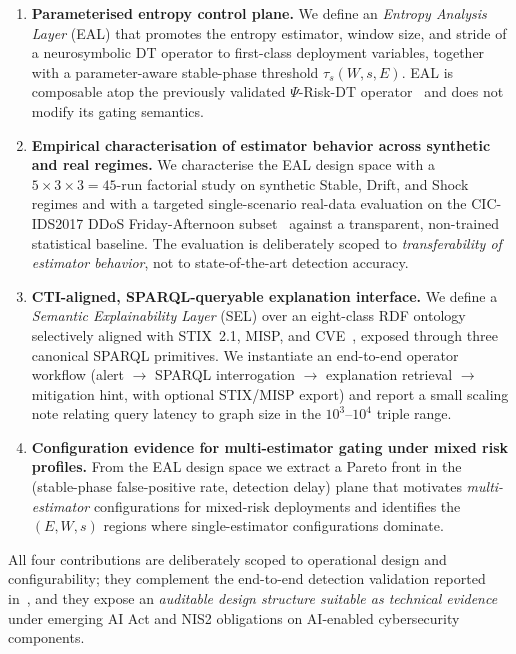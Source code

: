 \documentclass[runningheads]{llncs}
\newcommand{\psiop}{\ensuremath{\Psi}}
\newcommand{\taus}{\ensuremath{\tau_{s}}}
\begin{document}
\begin{enumerate}[label=\textbf{C\arabic*.},leftmargin=*]
  \item \textbf{Parameterised entropy control plane.} We define an
        \emph{Entropy Analysis Layer} (EAL) that promotes the entropy
        estimator, window size, and stride of a neurosymbolic DT
        operator to first-class deployment variables, together with a
        parameter-aware stable-phase threshold $\taus(W, s, E)$. EAL is
        composable atop the previously validated $\psiop$-Risk-DT
        operator~\cite{paper3} and does not modify its gating semantics.
  \item \textbf{Empirical characterisation of estimator behavior across
        synthetic and real regimes.} We characterise the EAL design
        space with a $5 \times 3 \times 3 = 45$-run factorial study on
        synthetic Stable, Drift, and Shock regimes and with a targeted
        single-scenario real-data evaluation on the CIC-IDS2017 DDoS
        Friday-Afternoon subset~\cite{cicids2017} against a transparent,
        non-trained statistical baseline. The evaluation is deliberately
        scoped to \emph{transferability of estimator behavior}, not to
        state-of-the-art detection accuracy.
  \item \textbf{CTI-aligned, SPARQL-queryable explanation interface.}
        We define a \emph{Semantic Explainability Layer} (SEL) over an
        eight-class RDF ontology selectively aligned with STIX~2.1,
        MISP, and CVE~\cite{stix21,misp}, exposed through three
        canonical SPARQL primitives. We instantiate an end-to-end
        operator workflow (alert $\to$ SPARQL interrogation $\to$
        explanation retrieval $\to$ mitigation hint, with optional
        STIX/MISP export) and report a small scaling note relating query
        latency to graph size in the $10^{3}$--$10^{4}$ triple range.
  \item \textbf{Configuration evidence for multi-estimator gating under
        mixed risk profiles.} From the EAL design space we extract a
        Pareto front in the (stable-phase false-positive rate, detection
        delay) plane that motivates \emph{multi-estimator} configurations
        for mixed-risk deployments and identifies the $(E, W, s)$
        regions where single-estimator configurations dominate.
\end{enumerate}

\noindent All four contributions are deliberately scoped to operational
design and configurability; they complement the end-to-end detection
validation reported in~\cite{paper3}, and they expose an \emph{auditable
design structure suitable as technical evidence} under emerging AI Act
and NIS2 obligations on AI-enabled cybersecurity components.
\end{document}
